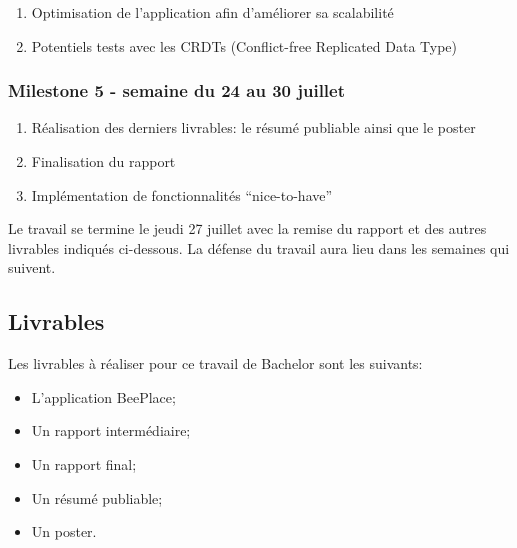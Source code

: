 \begin{enumerate}
  \item Optimisation de l'application afin d'améliorer sa scalabilité
  \item Potentiels tests avec les CRDTs (Conflict-free Replicated Data Type)
\end{enumerate}

\subsubsection{Milestone 5 - semaine du 24 au 30 juillet}

\begin{enumerate}
  \item Réalisation des derniers livrables: le résumé publiable ainsi que le poster
  \item Finalisation du rapport
  \item Implémentation de fonctionnalités “nice-to-have”
\end{enumerate}

Le travail se termine le jeudi 27 juillet avec la remise du rapport et des autres livrables indiqués ci-dessous. La défense du travail aura lieu dans les semaines qui suivent.

\subsection{Livrables}

Les livrables à réaliser pour ce travail de Bachelor sont les suivants:

\begin{itemize}
  \item L'application BeePlace;
  \item Un rapport intermédiaire;
  \item Un rapport final;
  \item Un résumé publiable;
  \item Un poster.
\end{itemize}

